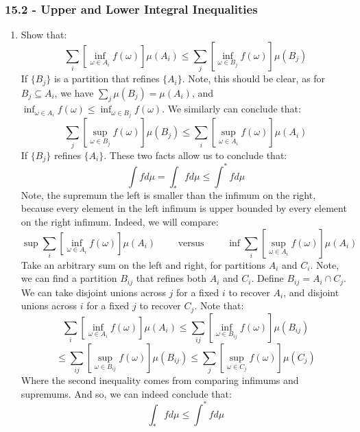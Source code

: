 \documentclass[12pt,a4paper]{article}
\newcommand{\1}[1]{\mathbbm{1}\left\{ #1 \right\}}
\begin{document}
\subsubsection{15.2 - Upper and Lower Integral Inequalities}
\begin{enumerate}
	\item Show that:
	$$
		\sum_i \left[\inf_{\omega \in A_i} f(\omega)\right]\mu(A_i) \leq
		\sum_j \left[\inf_{\omega \in B_j} f(\omega)\right]\mu(B_j)
	$$
	If $\{B_j\}$ is a partition that refines $\{A_i\}$. Note, this should be clear, as for $B_j \subseteq A_i$, we have $\sum_j \mu(B_j) = \mu(A_i)$, and $\inf_{\omega \in A_i} f(\omega) \leq \inf_{\omega \in B_j} f(\omega)$. We similarly can conclude that:
	$$
		\sum_j \left[\sup_{\omega \in B_j} f(\omega)\right]\mu(B_j) \leq 
		\sum_i \left[\sup_{\omega \in A_i} f(\omega)\right]\mu(A_i)
	$$
	If $\{B_j\}$ refines $\{A_i\}$. These two facts allow us to conclude that:
	$$
		\int f d\mu = \int_* f d\mu \leq \int^* f d\mu
	$$
	Note, the supremum the left is smaller than the infimum on the right, because every element in the left infimum is upper bounded by every element on the right infimum. Indeed, we will compare:
	$$
		\sup \sum_i \left[\inf_{\omega \in A_i} f(\omega)\right] \mu(A_i) 
		\quad\quad\text{ versus }\quad\quad
		\inf \sum_i \left[\sup_{\omega \in A_i} f(\omega)\right] \mu(A_i)
	$$
	Take an arbitrary sum on the left and right, for partitions $A_i$ and $C_i$. Note, we can find a partition $B_{ij}$ that refines both $A_i$ and $C_i$. Define $B_{ij} = A_i \cap C_j$. We can take disjoint unions across $j$ for a fixed $i$ to recover $A_i$, and disjoint unions across $i$ for a fixed $j$ to recover $C_j$. Note that:
	$$
		\sum_i \left[\inf_{\omega \in A_i} f(\omega)\right] \mu(A_i) \leq
		\sum_{ij} \left[\inf_{\omega \in B_{ij}} f(\omega)\right] \mu(B_{ij}) 
	$$
	$$
		\leq
		\sum_{ij} \left[\sup_{\omega \in B_{ij}} f(\omega)\right] \mu(B_{ij}) \leq
		\sum_j \left[\sup_{\omega \in C_j} f(\omega)\right] \mu(C_j)
	$$
	Where the second inequality comes from comparing infimums and supremums. And so, we can indeed conclude that:
	$$
		\int_* f d\mu \leq \int^* f d\mu
	$$
	

\end{enumerate}
\end{document}

